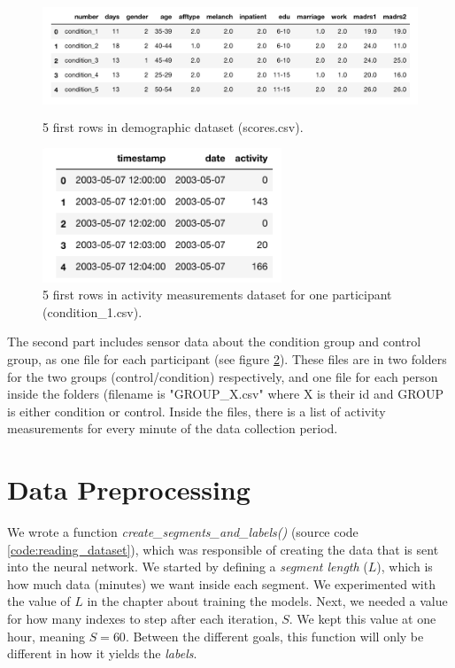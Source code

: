 \begin{figure}[h]
  \begin{center}
      \includegraphics[height=3.5cm]{img/demographics.png}
      \caption{5 first rows in demographic dataset (scores.csv).}
      \label{figure:demographics}
  \end{center}
\end{figure}

\begin{figure}[h]
  \begin{center}
      \includegraphics[height=4cm]{img/participant.png}
      \caption{5 first rows in activity measurements dataset for one participant (condition\_1.csv).}
      \label{figure:participant_activity}
  \end{center}
\end{figure}

The second part includes sensor data about the condition group and control group, as one file for each participant (see figure \ref{figure:participant_activity}). These files are in two folders for the two groups (control/condition) respectively, and one file for each person inside the folders (filename is "GROUP\_X.csv" where X is their id and GROUP is either condition or control. Inside the files, there is a list of activity measurements for every minute of the data collection period.

\section{Data Preprocessing}

We wrote a function \textit{create\_segments\_and\_labels()} (source code \ref{code:reading_dataset}), which was responsible of creating the data that is sent into the neural network. We started by defining a \textit{segment length} ($L$), which is how much data (minutes) we want inside each segment. We experimented with the value of $L$ in the chapter about training the models. Next, we needed a value for how many indexes to step after each iteration, $S$. We kept this value at one hour, meaning $S=60$. Between the different goals, this function will only be different in how it yields the \textit{labels}.

